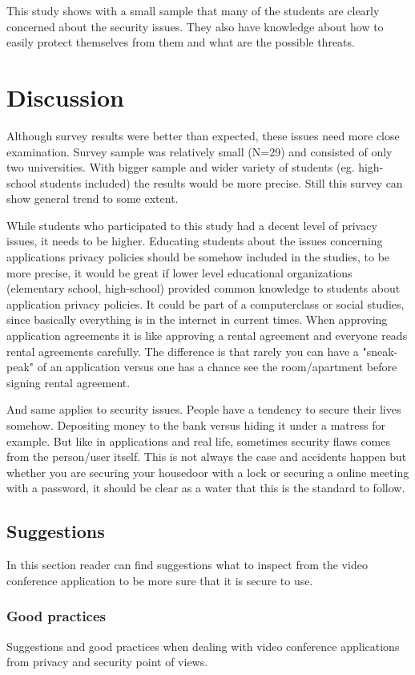 \documentclass[utf8,english]{gradu3}
\begin{document}
This study shows with a small sample that many of the students are clearly concerned about the security issues. They also have knowledge about how to easily protect themselves from them and what are the possible threats. 


\chapter{Discussion}
\label{discussion}
Although survey results were better than expected, these issues need more close examination. Survey sample was relatively small (N=29) and consisted of only two universities. With bigger sample and wider variety of students (eg. high-school students included) the results would be more precise. Still this survey can show general trend to some extent.

While students who participated to this study had a decent level of privacy issues, it needs to be higher. Educating students about the issues concerning applications privacy policies should be somehow included in the studies, to be more precise, it would be great if lower level educational organizations (elementary school, high-school) provided common knowledge to students about application privacy policies. It could be part of a computerclass or social studies, since basically everything is in the internet in current times.
When approving application agreements it is like approving a rental agreement and everyone reads rental agreements carefully. The difference is that rarely you can have a "sneak-peak" of an application versus one has a chance see the room/apartment before signing rental agreement.

And same applies to security issues. People have a tendency to secure their lives somehow. Depositing money to the bank versus hiding it under a matress for example. But like in applications and real life, sometimes security flaws comes from the person/user itself. This is not always the case and accidents happen but whether you are securing your housedoor with a lock or securing a online meeting with a password, it should be clear as a water that this is the standard to follow.

\section{Suggestions}
In this section reader can find suggestions what to inspect from the video conference application to be more sure that it is secure to use.
\subsection{Good practices}
Suggestions and good practices when dealing with video conference applications from privacy and security point of views.
\end{document}
